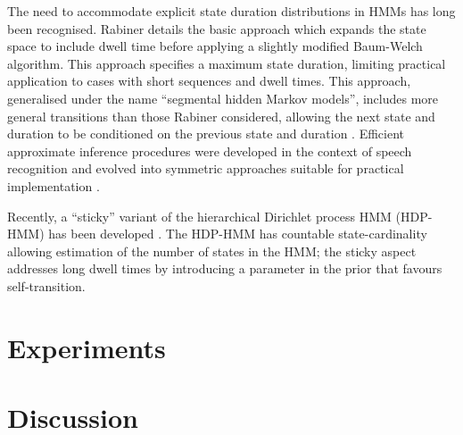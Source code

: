 \documentclass[journal]{../inc/oldtran/IEEEtran}
\begin{document}
The need to accommodate explicit state duration distributions in HMMs has long been recognised. Rabiner \cite{Rabiner89} details the basic approach which expands the state space to include dwell time before applying a slightly modified Baum-Welch algorithm. This approach specifies a maximum state duration, limiting practical application 
to cases with short sequences and dwell times.
This approach, generalised under the name ``segmental hidden Markov models'', includes more general transitions than those Rabiner considered, allowing the next state and duration to be conditioned on the previous state and duration \cite{Gales93}. Efficient approximate inference procedures were developed in the context of speech recognition \cite{Ostendorf96} and evolved into symmetric approaches suitable for practical implementation \cite{Yu2006}.

Recently, a ``sticky'' variant of the hierarchical Dirichlet process HMM (HDP-HMM) has been developed \cite{Fox2008}.  The HDP-HMM has countable state-cardinality \cite{Teh06} allowing estimation of the number of states in the HMM; the sticky aspect addresses long dwell times by introducing a parameter in the prior that favours self-transition. 


\section{Experiments}

\label{sec:experiments}




\section{Discussion}

\label{sec:dicussion}






\end{document}
